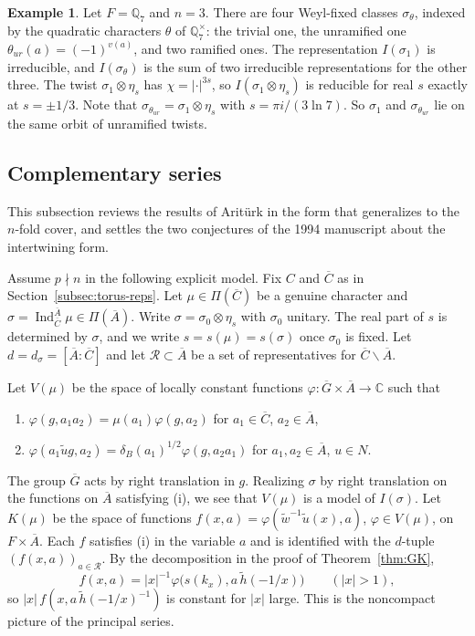 \documentclass[12pt,letterpaper]{article}
\numberwithin{equation}{section}
\theoremstyle{definition}
\newtheorem{xexample}[theorem]{Example}
\newcommand{\C}{\mathbb C}
\newcommand{\Q}{\mathbb Q}
\newcommand{\bG}{\overline{G}}
\newcommand{\bA}{\overline{A}}
\newcommand{\bC}{\overline{C}}
\newcommand{\wt}{\tilde w}
\newcommand{\hl}{\tilde h}
\newcommand{\ul}{\tilde u}
\DeclareMathOperator{\Ind}{Ind}
\begin{document}
\begin{xexample}\label{ex:red-Q7}
Let $F=\Q_7$ and $n=3$.  There are four Weyl-fixed classes $\sigma_\theta$, indexed by the
quadratic characters $\theta$ of $\Q_7^\times$: the trivial one, the unramified one
$\theta_{ur}(a)=(-1)^{v(a)}$, and two ramified ones.  The representation $I(\sigma_1)$ is
irreducible, and $I(\sigma_\theta)$ is the sum of two irreducible representations for the
other three.  The twist $\sigma_1\otimes\eta_s$ has $\chi=|\cdot|^{3s}$, so
$I(\sigma_1\otimes\eta_s)$ is reducible for real $s$ exactly at $s=\pm1/3$.  Note that
$\sigma_{\theta_{ur}}=\sigma_1\otimes\eta_{s}$ with $s=\pi i/(3\ln7)$.  So $\sigma_1$ and
$\sigma_{\theta_{ur}}$ lie on the same orbit of unramified twists.
\end{xexample}

\subsection{Complementary series}\label{subsec:cs}

This subsection reviews the results of Arit\"urk \cite{Ar80} in the form that generalizes
to the $n$-fold cover, and settles the two conjectures of the 1994 manuscript about the
intertwining form.

Assume $p\nmid n$ in the following explicit model. Fix $C$ and $\bC$ as in Section~\ref{subsec:torus-reps}.  Let $\mu\in\Pi(\bC)$ be a genuine
character and $\sigma=\Ind_{\bC}^{\bA}\mu\in\Pi(\bA)$.  Write $\sigma=\sigma_0\otimes\eta_s$ with
$\sigma_0$ unitary.  The real part of $s$ is determined by $\sigma$, and we write
$s=s(\mu)=s(\sigma)$ once $\sigma_0$ is fixed.  Let $d=d_\sigma=[\bA:\bC]$ and let
$\mathcal R\subset\bA$ be a set of representatives for $\bC\backslash\bA$.

Let $V(\mu)$ be the space of locally constant functions
$\varphi:\bG\times\bA\to\C$ such that
\begin{enumerate}[label=(\roman*),leftmargin=*,itemsep=1pt]
\item $\varphi(g,a_1a_2)=\mu(a_1)\varphi(g,a_2)$ for $a_1\in\bC$, $a_2\in\bA$,
\item $\varphi(a_1\tilde ug,a_2)=\delta_B(a_1)^{1/2}\varphi(g,a_2a_1)$ for $a_1,a_2\in\bA$, $u\in N$.
\end{enumerate}
The group $\bG$ acts by right translation in $g$.  Realizing $\sigma$ by right translation
on the functions on $\bA$ satisfying (i), we see that $V(\mu)$ is a model of $I(\sigma)$.
Let $K(\mu)$ be the space of functions
$f(x,a)=\varphi(\wt^{-1}\ul(x),a)$, $\varphi\in V(\mu)$, on $F\times\bA$.  Each $f$ satisfies
(i) in the variable $a$ and is identified with the $d$-tuple $(f(x,a))_{a\in\mathcal R}$.  By
the decomposition in the proof of Theorem~\ref{thm:GK},
\[
f(x,a)=|x|^{-1}\varphi\bigl(s(k_x),a\,\hl(-1/x)\bigr)\qquad(|x|>1),
\]
so $|x|\,f(x,a\,\hl(-1/x)^{-1})$ is constant for $|x|$ large.  This is the noncompact
picture of the principal series.
\end{document}
